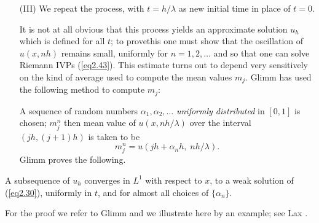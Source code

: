 \begin{itemize}
\item[{\rm (III)}] We repeat the process, with $t = h/\lambda$ as new initial time in place of $t=0$.

It is not at all obvious that this process yields an approximate solution $u_h$ which is defined for all $t$; to prove\pageoriginale this one must show that the oscillation of $u(x,nh)$ remains small, uniformly for $n = 1,2, \ldots$ and so that one can solve Riemann IVPs (\ref{eq2.43}). This estimate turns out to depend very sensitively on the kind of average used to compute the mean values $m_j$. Glimm has used the following method to compute $m_j$:

A sequence of random numbers $\alpha_1 , \alpha_2, \ldots$ {\em uniformly distributed} in $[0,1]$ is chosen; $m^n_j$ then mean value of $u(x, nh/\lambda)$ over the interval $(jh, (j+1)h)$ is taken to be 
\begin{equation*}
m^n_j = u (jh + \alpha_nh, \; nh /\lambda). 
\tag{2.45}\label{eq2.45}
\end{equation*}
Glimm proves the following.
\end{itemize}

\begin{thm}\label{chap2:thm5}
A subsequence of $u_h$ converges in $L^1$ with respect to $x$, to a weak solution of (\ref{eq2.30}), uniformly in $t$, and for almost all choices of $\{\alpha_n\}$.
\end{thm}

For the proof we refer to Glimm \cite{key15} and we illustrate here by an example; see Lax \cite{key23}.

